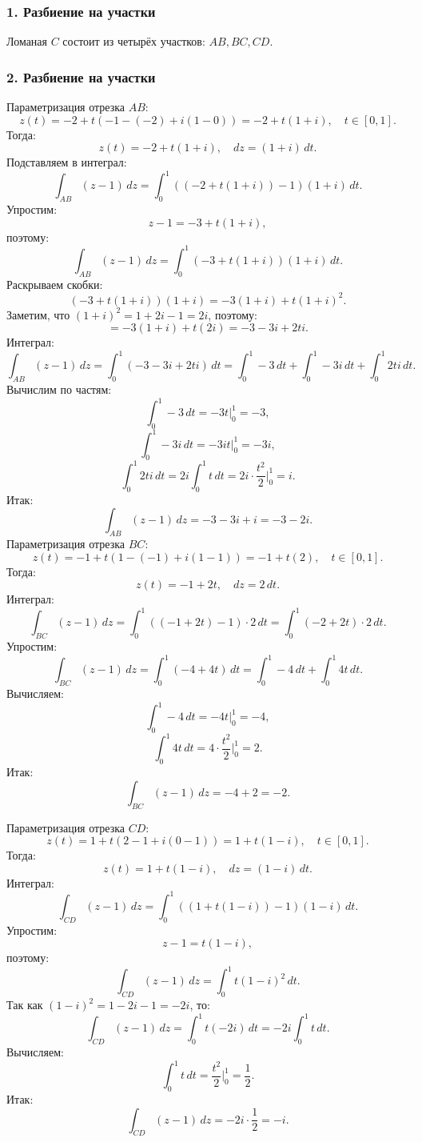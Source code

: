 \documentclass[a4paper,12pt]{article}
\begin{document}
\subsubsection*{1. Разбиение на участки}
Ломаная \( C \) состоит из четырёх участков: \( AB, BC, CD \).

\subsubsection*{2. Разбиение на участки}

Параметризация отрезка \( AB \):
\[
z(t) = -2 + t(-1 - (-2) + i(1 - 0)) = -2 + t(1 + i), \quad t \in [0, 1].
\]
Тогда:
\[
z(t) = -2 + t(1 + i), \quad dz = (1 + i) \, dt.
\]
Подставляем в интеграл:
\[
\int_{AB} (z - 1) \, dz = \int_0^1 \left((-2 + t(1 + i)) - 1\right)(1 + i) \, dt.
\]
Упростим:
\[
z - 1 = -3 + t(1 + i),
\]
поэтому:
\[
\int_{AB} (z - 1) \, dz = \int_0^1 (-3 + t(1 + i))(1 + i) \, dt.
\]
Раскрываем скобки:
\[
(-3 + t(1 + i))(1 + i) = -3(1 + i) + t(1 + i)^2.
\]
Заметим, что \((1 + i)^2 = 1 + 2i - 1 = 2i\), поэтому:
\[
= -3(1 + i) + t(2i) = -3 - 3i + 2ti.
\]
Интеграл:
\[
\int_{AB} (z - 1) \, dz = \int_0^1 (-3 - 3i + 2ti) \, dt = \int_0^1 -3 \, dt + \int_0^1 -3i \, dt + \int_0^1 2ti \, dt.
\]
Вычислим по частям:
\[
\int_0^1 -3 \, dt = -3t \Big|_0^1 = -3,
\]
\[
\int_0^1 -3i \, dt = -3it \Big|_0^1 = -3i,
\]
\[
\int_0^1 2ti \, dt = 2i \int_0^1 t \, dt = 2i \cdot \frac{t^2}{2} \Big|_0^1 = i.
\]
Итак:
\[
\int_{AB} (z - 1) \, dz = -3 - 3i + i = -3 - 2i.
\]
Параметризация отрезка \( BC \):
\[
z(t) = -1 + t(1 - (-1) + i(1 - 1)) = -1 + t(2), \quad t \in [0, 1].
\]
Тогда:
\[
z(t) = -1 + 2t, \quad dz = 2 \, dt.
\]
Интеграл:
\[
\int_{BC} (z - 1) \, dz = \int_0^1 \left((-1 + 2t) - 1\right) \cdot 2 \, dt = \int_0^1 (-2 + 2t) \cdot 2 \, dt.
\]
Упростим:
\[
\int_{BC} (z - 1) \, dz = \int_0^1 (-4 + 4t) \, dt = \int_0^1 -4 \, dt + \int_0^1 4t \, dt.
\]
Вычисляем:
\[
\int_0^1 -4 \, dt = -4t \Big|_0^1 = -4,
\]
\[
\int_0^1 4t \, dt = 4 \cdot \frac{t^2}{2} \Big|_0^1 = 2.
\]
Итак:
\[
\int_{BC} (z - 1) \, dz = -4 + 2 = -2.
\]

Параметризация отрезка \( CD \):
\[
z(t) = 1 + t(2 - 1 + i(0 - 1)) = 1 + t(1 - i), \quad t \in [0, 1].
\]
Тогда:
\[
z(t) = 1 + t(1 - i), \quad dz = (1 - i) \, dt.
\]
Интеграл:
\[
\int_{CD} (z - 1) \, dz = \int_0^1 \left((1 + t(1 - i)) - 1\right)(1 - i) \, dt.
\]
Упростим:
\[
z - 1 = t(1 - i),
\]
поэтому:
\[
\int_{CD} (z - 1) \, dz = \int_0^1 t(1 - i)^2 \, dt.
\]
Так как \((1 - i)^2 = 1 - 2i - 1 = -2i\), то:
\[
\int_{CD} (z - 1) \, dz = \int_0^1 t(-2i) \, dt = -2i \int_0^1 t \, dt.
\]
Вычисляем:
\[
\int_0^1 t \, dt = \frac{t^2}{2} \Big|_0^1 = \frac{1}{2}.
\]
Итак:
\[
\int_{CD} (z - 1) \, dz = -2i \cdot \frac{1}{2} = -i.
\]
\end{document}
